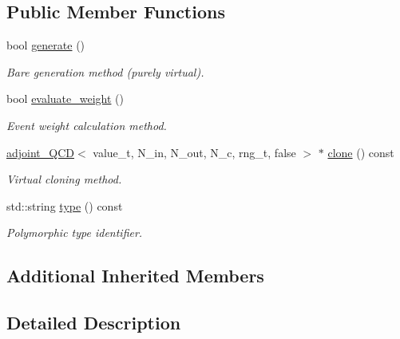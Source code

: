 \subsection*{Public Member Functions}
\begin{DoxyCompactItemize}
\item 
bool \hyperlink{a00004_a8c71ddaea3b2e2eedc6b3b15504d4138}{generate} ()
\begin{DoxyCompactList}\small\item\em \textquotesingle{}Bare generation\textquotesingle{} method (purely virtual). \end{DoxyCompactList}\item 
\hypertarget{a00004_ad2e098b86b78b75c850dba91d69de541}{}bool \hyperlink{a00004_ad2e098b86b78b75c850dba91d69de541}{evaluate\+\_\+weight} ()\label{a00004_ad2e098b86b78b75c850dba91d69de541}

\begin{DoxyCompactList}\small\item\em Event weight calculation method. \end{DoxyCompactList}\item 
\hypertarget{a00004_aa2179663ef82c7ffbaf1d56cc6f8aed6}{}\hyperlink{a00003}{adjoint\+\_\+\+Q\+C\+D}$<$ value\+\_\+t, N\+\_\+in, N\+\_\+out, N\+\_\+c, rng\+\_\+t, false $>$ $\ast$ \hyperlink{a00004_aa2179663ef82c7ffbaf1d56cc6f8aed6}{clone} () const \label{a00004_aa2179663ef82c7ffbaf1d56cc6f8aed6}

\begin{DoxyCompactList}\small\item\em Virtual cloning method. \end{DoxyCompactList}\item 
\hypertarget{a00004_ada2323a7b2d8663e153429e9be08542d}{}std\+::string \hyperlink{a00004_ada2323a7b2d8663e153429e9be08542d}{type} () const \label{a00004_ada2323a7b2d8663e153429e9be08542d}

\begin{DoxyCompactList}\small\item\em Polymorphic type identifier. \end{DoxyCompactList}\end{DoxyCompactItemize}
\subsection*{Additional Inherited Members}


\subsection{Detailed Description}
